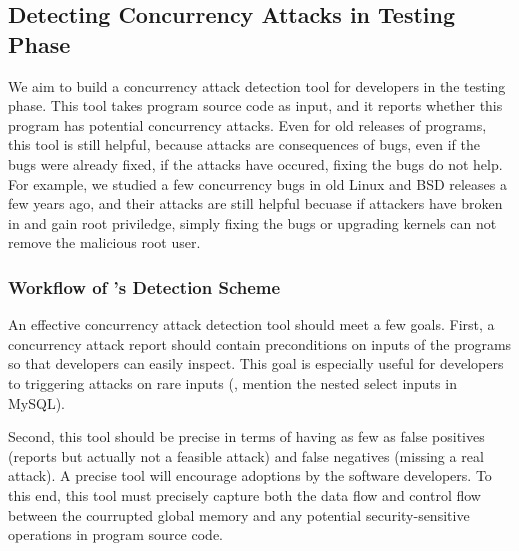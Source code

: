 





\subsection{Detecting Concurrency Attacks in Testing Phase}\label{sec:detect}

We aim to build a concurrency attack detection tool for developers in the 
testing phase. This tool takes program source code as input, and it reports 
whether this program has potential concurrency attacks. Even for old releases 
of programs, this tool is still helpful, because attacks are consequences of 
bugs, even if the bugs were already fixed, if the attacks have occured, fixing 
the bugs do not help. For example, we studied a few concurrency bugs in old 
Linux and BSD releases a few years ago, and their attacks are still helpful 
becuase if attackers have broken in and gain root priviledge, simply fixing the 
bugs or upgrading kernels can not remove the malicious root user.

\subsubsection{Workflow of \xxx's Detection Scheme}\label{sec:detect-arch}

An effective concurrency attack detection tool should meet a few goals. First, 
a concurrency attack report should contain preconditions on inputs of the 
programs so that developers can easily inspect. This goal is especially useful 
for developers to triggering attacks on rare inputs (\eg, mention the nested 
select inputs in MySQL).

Second, this tool should be precise in terms of having as few as false 
positives (reports but actually not a feasible attack) and false negatives 
(missing a real attack). A precise tool will encourage adoptions by the 
software developers. To this end, this tool must precisely capture both the 
data flow and control flow between the courrupted global memory and any 
potential security-sensitive operations in program source code. 

